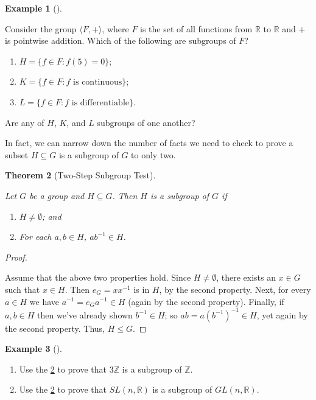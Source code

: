 \documentclass[10pt,]{book}
\theoremstyle{plain}
\newtheorem{theorem}{Theorem}[section]
\theoremstyle{definition}
\theoremstyle{definition}
\theoremstyle{definition}
\newtheorem{example}[theorem]{Example}
\theoremstyle{definition}
\numberwithin{equation}{section}
\def\Z{\mathbb{Z}}
\def\R{\mathbb{R}}
\begin{document}
\begin{example}[]\label{FHKL}

        Consider the group \(\langle F,+\rangle\), where \(F\) is the set of all functions from \(\R\) to \(\R\) and \(+\) is pointwise addition. Which of the following are subgroups of \(F\)?
        \leavevmode%
\begin{enumerate}
\item\hypertarget{li-202}{}
            \(H=\{f\in F: f(5)=0\}\);
\item\hypertarget{li-203}{}
            \(K=\{f\in F: f \text{ is continuous} \}\);
\item\hypertarget{li-204}{}
            \(L=\{f\in F: f \text{ is differentiable} \}\).
\end{enumerate}

\par

        Are any of \(H\), \(K\), and \(L\) subgroups of one another?
\end{example}
\par

    In fact, we can narrow down the number of facts we need to
    check to prove a subset \(H\subseteq G\) is a subgroup of \(G\) to only
    two.
\begin{theorem}[{Two-Step Subgroup Test}]\label{twostep}

         Let \(G\) be
        a group and \(H\subseteq G\). Then \(H\) is a subgroup of \(G\) if
\leavevmode%
\begin{enumerate}
\item\hypertarget{li-205}{}         \(H\neq \emptyset\); and%
\item\hypertarget{li-206}{}        For each \(a,b\in H\), \(ab^{-1}\in H\).%
\end{enumerate}
\end{theorem}
\begin{proof}\hypertarget{proof-19}{}

      Assume that the above two properties hold. Since \(H\neq
      \emptyset\), there exists an \(x\in G\) such that \(x\in H\). Then
      \(e_G=xx^{-1}\) is in \(H\), by the second property. Next, for every
      \(a\in H\) we have \(a^{-1}=e_Ga^{-1}\in H\) (again by the second
      property). Finally, if \(a,b\in H\) then we've already shown
      \(b^{-1}\in H\); so \(ab=a(b^{-1})^{-1}\in H\), yet again by the second
      property. Thus, \(H\leq G\).
\end{proof}
\begin{example}[]\label{example-39}
\leavevmode%
\begin{enumerate}
\item\hypertarget{li-207}{}
            Use the \hyperref[twostep]{\ref{twostep}} to prove that \(3\Z\) is a subgroup of \(\Z\).
\item\hypertarget{li-208}{}
            Use the \hyperref[twostep]{\ref{twostep}} to prove that \(SL(n,\R)\) is a subgroup of \(GL(n,\R)\).
\end{enumerate}
\end{example}
\par
\end{document}
